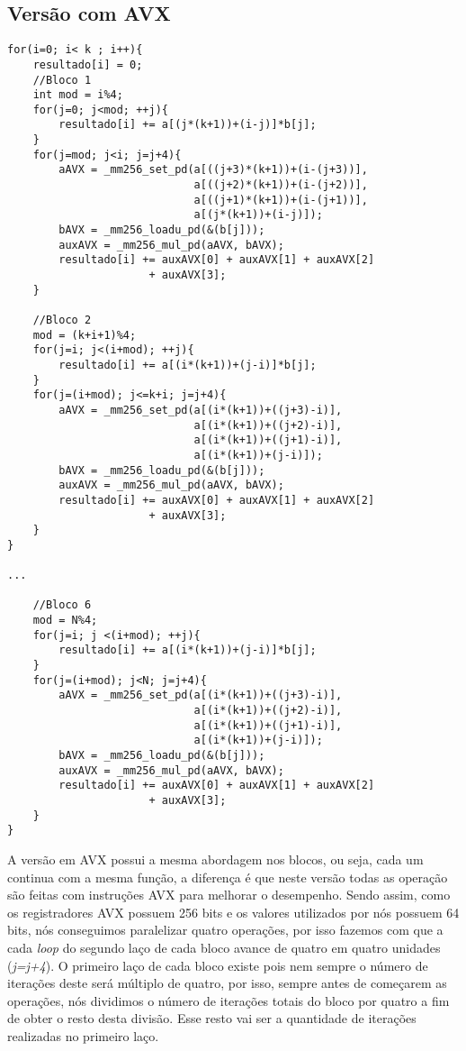 \documentclass[12pt]{article}
\begin{document}
\subsection{Versão com AVX}
\begin{lstlisting}
for(i=0; i< k ; i++){
    resultado[i] = 0;
    //Bloco 1
    int mod = i%4;
    for(j=0; j<mod; ++j){
        resultado[i] += a[(j*(k+1))+(i-j)]*b[j];
    }
    for(j=mod; j<i; j=j+4){
        aAVX = _mm256_set_pd(a[((j+3)*(k+1))+(i-(j+3))],
                             a[((j+2)*(k+1))+(i-(j+2))],
                             a[((j+1)*(k+1))+(i-(j+1))],
                             a[(j*(k+1))+(i-j)]);
        bAVX = _mm256_loadu_pd(&(b[j]));
        auxAVX = _mm256_mul_pd(aAVX, bAVX);
        resultado[i] += auxAVX[0] + auxAVX[1] + auxAVX[2]
                      + auxAVX[3];
    }

    //Bloco 2
    mod = (k+i+1)%4;
    for(j=i; j<(i+mod); ++j){
        resultado[i] += a[(i*(k+1))+(j-i)]*b[j];
    }
    for(j=(i+mod); j<=k+i; j=j+4){
        aAVX = _mm256_set_pd(a[(i*(k+1))+((j+3)-i)],
                             a[(i*(k+1))+((j+2)-i)],
                             a[(i*(k+1))+((j+1)-i)],
                             a[(i*(k+1))+(j-i)]);
        bAVX = _mm256_loadu_pd(&(b[j]));
        auxAVX = _mm256_mul_pd(aAVX, bAVX);
        resultado[i] += auxAVX[0] + auxAVX[1] + auxAVX[2]
                      + auxAVX[3];
    }
}

...

    //Bloco 6
    mod = N%4;
    for(j=i; j <(i+mod); ++j){
        resultado[i] += a[(i*(k+1))+(j-i)]*b[j];
    }
    for(j=(i+mod); j<N; j=j+4){
        aAVX = _mm256_set_pd(a[(i*(k+1))+((j+3)-i)],
                             a[(i*(k+1))+((j+2)-i)],
                             a[(i*(k+1))+((j+1)-i)],
                             a[(i*(k+1))+(j-i)]);
        bAVX = _mm256_loadu_pd(&(b[j]));
        auxAVX = _mm256_mul_pd(aAVX, bAVX);
        resultado[i] += auxAVX[0] + auxAVX[1] + auxAVX[2]
                      + auxAVX[3];
    }
}
\end{lstlisting}

A versão em AVX possui a mesma abordagem nos blocos, ou seja, cada um continua com a mesma função, a diferença é que neste versão todas as operação são feitas com instruções AVX para melhorar o desempenho. Sendo assim, como os registradores AVX possuem 256 bits e os valores utilizados por nós possuem 64 bits, nós conseguimos paralelizar quatro operações, por isso fazemos com que a cada \textit{loop} do segundo laço de cada bloco avance de quatro em quatro unidades (\textit{j=j+4}). O primeiro laço de cada bloco existe pois nem sempre o número de iterações deste será múltiplo de quatro, por isso, sempre antes de começarem as operações, nós dividimos o número de iterações totais do bloco por quatro a fim de obter o resto desta divisão. Esse resto vai ser a quantidade de iterações realizadas no primeiro laço.
\end{document}
